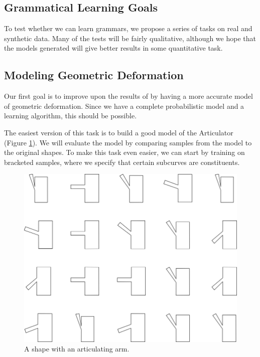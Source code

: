 

\subsection{Grammatical Learning Goals}

To test whether we can learn grammars, we propose a series of tasks on
real and synthetic data. Many of the tests will be fairly qualitative,
although we hope that the models generated will give better results in
some quantitative task.

\subsection{Modeling Geometric Deformation}

Our first goal is to improve upon the results of \cite{hcm} by having
a more accurate model of geometric deformation. Since we have a
complete probabilistic model and a learning algorithm, this should be
possible.

The easiest version of this task is to build a good model of the
Articulator (Figure \ref{fig-articulator}). We will evaluate the model
by comparing samples from the model to the original shapes. To make
this task even easier, we can start by training on bracketed samples,
where we specify that certain subcurves are constituents.

\begin{figure}
\includegraphics[width=\linewidth]{figures/articulator/articulator_samples.png}
\caption{A shape with an articulating arm.}
\label{fig-articulator}
\end{figure}


